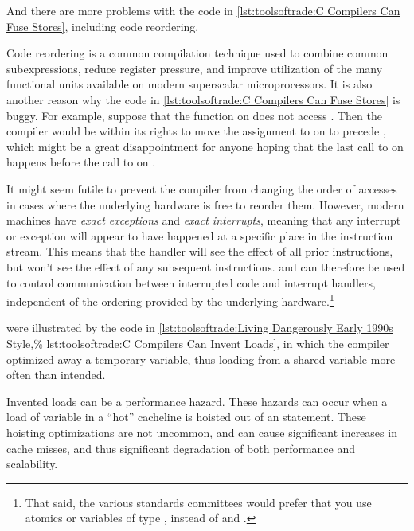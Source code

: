 \begin{description}[labelsep=.4em]
\begin{fcvref}
And there are more problems with the code in
\cref{lst:toolsoftrade:C Compilers Can Fuse Stores},
including code reordering.

\item[Code reordering] is a common compilation technique used to
combine common subexpressions, reduce register pressure, and
improve utilization of the many functional units available on
modern superscalar microprocessors.
It is also another reason why the code in
\cref{lst:toolsoftrade:C Compilers Can Fuse Stores}
is buggy.
For example, suppose that the  function on
does not access .
Then the compiler would be within its rights to move the assignment
to  on
 to precede , which might
be a great disappointment for anyone hoping that the last call to
 on  happens before the call to
 on .
\end{fcvref}

It might seem futile to prevent the compiler from changing the order of
accesses in cases where the underlying hardware is free to reorder them.
However, modern machines have \emph{exact exceptions} and
\emph{exact interrupts}, meaning that any interrupt or exception will
appear to have happened at a specific place in the instruction
stream.
This means that the handler will see the effect of all prior
instructions, but won't see the effect of any subsequent instructions.
 and  can therefore be used to
control communication between interrupted code and interrupt handlers,
independent of the ordering provided by the underlying hardware.\footnote{
	That said, the various standards committees would prefer that
	you use atomics or variables of type , instead
	of  and .}

\item[Invented loads] were illustrated by the code in
\cref{lst:toolsoftrade:Living Dangerously Early 1990s Style,%
lst:toolsoftrade:C Compilers Can Invent Loads},
in which the compiler optimized away a temporary variable,
thus loading from a shared variable more often than intended.

Invented loads can be a performance hazard.
These hazards can occur when a load of variable in a ``hot''
cacheline is hoisted out of an  statement.
These hoisting optimizations are not uncommon, and can cause significant
increases in cache misses, and thus significant degradation of
both performance and scalability.


\end{description}
